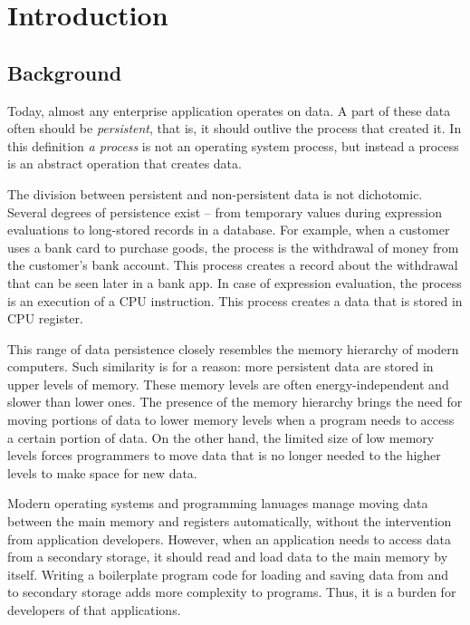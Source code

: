 \chapter{Introduction}

\section{Background}
\label{sec:intro-bg}

Today, almost any enterprise application operates on data. A part of these data
often should be \textit{persistent}, that is, it should outlive the process
that created it. In this definition \textit{a process} is not an operating
system process, but instead a process is an abstract operation that creates
data. 

The division between persistent and non-persistent data is not dichotomic.
Several degrees of persistence exist -- from temporary values during expression
evaluations to long-stored records in a database. For example, when a customer
uses a bank card to purchase goods, the process is the withdrawal of money from
the customer's bank account. This process creates a record about the withdrawal
that can be seen later in a bank app. In case of expression evaluation, the
process is an execution of a CPU instruction. This process creates a data that
is stored in CPU register.

This range of data persistence closely resembles the memory hierarchy of modern
computers. Such similarity is for a reason: more persistent data are stored in
upper levels of memory. These memory levels are often energy-independent and
slower than lower ones. The presence of the memory hierarchy brings the need
for moving portions of data to lower memory levels when a program needs to
access a certain portion of data. On the other hand, the limited size of low
memory levels forces programmers to move data that is no longer needed to the
higher levels to make space for new data.

Modern operating systems and programming lanuages manage moving data between
the main memory and registers automatically, without the intervention from
application developers. However, when an application needs to access data from
a secondary storage, it should read and load data to the main memory by itself.
Writing a boilerplate program code for loading and saving data from and to
secondary storage adds more complexity to programs. Thus, it is a burden for
developers of that applications.

